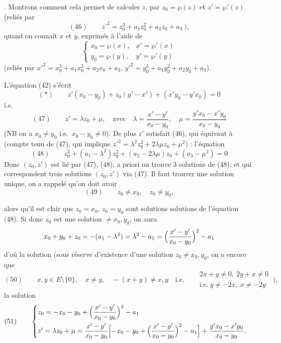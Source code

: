 \documentclass[11pt,a4paper]{article}
\begin{document}
. Montrons comment cela permet de calculer $z$, par $z_0 = \wp(z)$ et
$z' = \wp'(z)$ (reliés par
\[
  (46) \qquad z'^2 = z_0^3 + a_1 z_0^2 + a_2 z_0 + a_3 \ ),
\]
quand on connaît $x$ et $y$, exprimés à l'aide de
\[
  \begin{cases}
    x_0 = \wp(x), & x' = \wp'(x) \\
    y_0 = \wp(y), & y' = \wp'(y)
  \end{cases}
\]
(reliés par
$x'^2 = x_0^3 + a_1 x_0^2 + a_2 x_0 + a_3$,
$y'^2 = y_0^3 + a_1 y_0^2 + a_2 y_0 + a_3$).

L'équation (42) s'écrit
\[
  (*) \qquad z'(x_0 - y_0) + z_0(y' - x') + (x' y_0 - y' x_0) = 0
\]
i.e.
\[
  (47) \qquad z' = \lambda z_0 + \mu , \quad\text{avec}\quad
  \lambda = \frac{x' - y'}{x_0 - y_0} , \quad
  \mu = \frac{y' x_0 - x' y_0}{x_0 - y_0}
\]
 (NB on a $x_0 \neq y_0$ i.e.\ $x_0 - y_0 \neq 0$). De plus $z'$
satisfait (46), qui équivaut à  (compte tenu de (47), qui
implique $z'^2 = \lambda^2 z_0^2 + 2\lambda\mu z_0 + \mu^2$) : l'équation
\[
  (48) \qquad z_0^3 + (a_1 - \lambda^2) z_0^2 + (a_2 - 2\lambda\mu) z_0 +
  (a_3 - \mu^2) = 0
\]
Donc $(z_0, z')$ est lié par (47), (48), a priori on trouve 3 solutions  de (48), et qui correspondent trois solutions $(z_0, z')$ via (47). Il
faut trouver une solution unique, on a rappelé qu'on doit avoir
\[
  (49) \qquad z_0 \neq x_0 , \quad z_0 \neq y_0 ,
\]
\struck{\ill{}}

alors qu'il est clair que  $z_0 = x_0$, $z_0 = y_0$ sont solutions
 solutions de l'équation (48). Si donc $z_0$ est une solution
$\neq x_0, y_0$, on aura
\[
  x_0 + y_0 + z_0 = -(a_1 - \lambda^2) = \lambda^2 - a_1
  = \Bigl(\frac{x' - y'}{x_0 - y_0}\Bigr)^2 - a_1
\]
d'où la solution (sous réserve d'existence d'une solution $z_0 \neq x_0, y_0$,
on a encore \struck{\ill{}}  que
\[
  (50) \qquad x, y \in E \setminus \{0\}, \quad x \neq y , \quad
  -(x + y) \neq x, y \quad\text{i.e.}\quad
  \begin{aligned}
    & 2x + y \neq 0 , \ 2y + x \neq 0 \\
    & \text{i.e.}\ y \neq -2x , \ x \neq -2y
  \end{aligned}
  \ \Bigr) ,
\]
la solution
\[
  (51) \qquad
  \begin{cases}
    z_0 = -x_0 - y_0 + \Bigl(\dfrac{x' - y'}{x_0 - y_0}\Bigr)^2 - a_1 \\[2ex]
    z' = \lambda z_0 + \mu = \dfrac{x' - y'}{x_0 - y_0}
    \Bigl[ -x_0 - y_0 + \Bigl(\dfrac{x' - y'}{x_0 - y_0}\Bigr)^2 - a_1 \Bigr]
    + \dfrac{y' x_0 - x' y_0}{x_0 - y_0} .
  \end{cases}
\]
\end{document}

